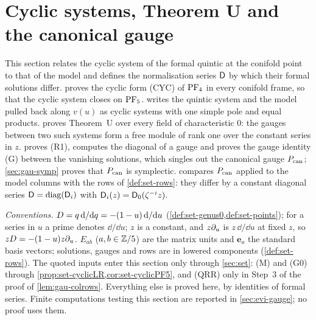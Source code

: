 \section{Cyclic systems, Theorem U and the canonical gauge}
\label{sec:gau}

This section relates the cyclic system of the formal quintic at the conifold point to that of the model and defines the normalisation series $\mathsf{D}$ by which their formal solutions differ.  proves the cyclic form (CYC) of $\mathrm{PF}_{4}$ in every conifold frame, so that the cyclic system closes on $\mathrm{PF}_{5}$.  writes the quintic system and the model pulled back along $v(u)$ as cyclic systems with one simple pole and equal products.  proves Theorem~U over every field of characteristic $0$: the gauges between two such systems form a free module of rank one over the constant series in $z$.  proves (R1), computes the diagonal of a gauge and proves the gauge identity (G) between the vanishing solutions, which singles out the canonical gauge $P_{\mathrm{can}}$; \cref{sec:gau-symp} proves that $P_{\mathrm{can}}$ is symplectic.  compares $P_{\mathrm{can}}$ applied to the model columns with the rows of \cref{def:set-rows}: they differ by a constant diagonal series $\mathsf{D}=\operatorname{diag}(\mathsf{D}_i)$ with $\mathsf{D}_i(z)=\mathsf{D}_0(\zeta^{-i}z)$.

\emph{Conventions.} $D=q\,\mathrm{d}/\mathrm{d} q=-(1-u)\,\mathrm{d}/\mathrm{d} u$ (\cref{def:set-genus0,def:set-points}); for a series in $u$ a prime denotes $\dd/\dd u$; $z$ is a constant, and $z\partial_u$ is $z\,\dd/\dd u$ at fixed $z$, so $zD=-(1-u)z\partial_u$. $E_{ab}$ ($a,b\in\mathbb{Z}/5$) are the matrix units and $\mathbf e_a$ the standard basis vectors; solutions, gauges and rows are in lowered components (\cref{def:set-rows}). The quoted inputs enter this section only through \cref{sec:set}: (M) and (G0) through \cref{prop:set-cyclicLR,cor:set-cyclicPF5}, and (QRR) only in Step~3 of the proof of \cref{lem:gau-colrows}. Everything else is proved here, by identities of formal series. Finite computations testing this section are reported in \cref{sec:evi-gauge}; no proof uses them.

